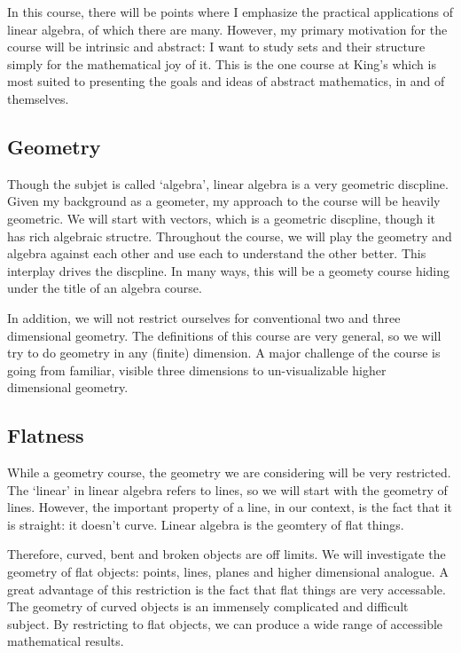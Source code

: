 \documentclass[fleqn]{report}
\begin{document}
In this course, there will be points where I emphasize the
practical applications of linear algebra, of which there are
many. However, my primary motivation for the course will be
intrinsic and abstract: I want to study sets and their
structure simply for the mathematical joy of it. This is the
one course at King's which is most suited to presenting the
goals and ideas of abstract mathematics, in and of themselves. 

\subsection{Geometry}
\label{geometry-theme}

Though the subjet is called `algebra', linear algebra is a
very geometric discpline. Given my background as a geometer,
my approach to the course will be heavily geometric. We
will start with vectors, which is a geometric discpline,
though it has rich algebraic structre. Throughout the course,
we will play the geometry and algebra against each other and
use each to understand the other better. This interplay drives
the discpline. In many ways, this will be a geomety course
hiding under the title of an algebra course.

In addition, we will not restrict ourselves for conventional
two and three dimensional geometry. The definitions of this
course are very general, so we will try to do geometry in any
(finite) dimension. A major challenge of the course is going
from familiar, visible three dimensions to un-visualizable
higher dimensional geometry.

\subsection{Flatness}
\label{flatness}

While a geometry course, the geometry we are considering will
be very restricted. The `linear' in linear algebra refers to
lines, so we will start with the geometry of lines. However,
the important property of a line, in our context, is the fact
that it is straight: it doesn't curve. Linear algebra is the
geomtery of flat things.

Therefore, curved, bent and broken objects are off limits. We
will investigate the geometry of flat objects: points, lines,
planes and higher dimensional analogue. A great advantage of
this restriction is the fact that flat things are very
accessable. The geometry of curved objects is an immensely
complicated and difficult subject. By restricting to flat
objects, we can produce a wide range of accessible
mathematical results. 
\end{document}
